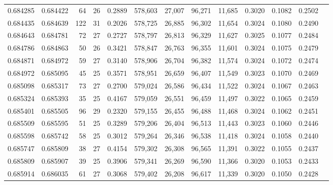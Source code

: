\begin{tabular}{rrrrrrrrrrrrr}
0.684285 & 0.684422 &  64 &  26 &                                     0.2889 & 578,603 &  27,007 &  96,271 &  11,685 & 0.3020 & 0.1082 & 0.2502 \\
0.684435 & 0.684639 & 122 &  31 &                                     0.2026 & 578,725 &  26,885 &  96,302 &  11,654 & 0.3024 & 0.1080 & 0.2490 \\
0.684643 & 0.684781 &  72 &  27 &                                     0.2727 & 578,797 &  26,813 &  96,329 &  11,627 & 0.3025 & 0.1077 & 0.2484 \\
0.684786 & 0.684863 &  50 &  26 &                                     0.3421 & 578,847 &  26,763 &  96,355 &  11,601 & 0.3024 & 0.1075 & 0.2479 \\
0.684871 & 0.684972 &  59 &  27 &                                     0.3140 & 578,906 &  26,704 &  96,382 &  11,574 & 0.3024 & 0.1072 & 0.2474 \\
0.684972 & 0.685095 &  45 &  25 &                                     0.3571 & 578,951 &  26,659 &  96,407 &  11,549 & 0.3023 & 0.1070 & 0.2469 \\
0.685098 & 0.685317 &  73 &  27 &                                     0.2700 & 579,024 &  26,586 &  96,434 &  11,522 & 0.3024 & 0.1067 & 0.2463 \\
0.685324 & 0.685393 &  35 &  25 &                                     0.4167 & 579,059 &  26,551 &  96,459 &  11,497 & 0.3022 & 0.1065 & 0.2459 \\
0.685401 & 0.685505 &  96 &  29 &                                     0.2320 & 579,155 &  26,455 &  96,488 &  11,468 & 0.3024 & 0.1062 & 0.2451 \\
0.685509 & 0.685595 &  51 &  25 &                                     0.3289 & 579,206 &  26,404 &  96,513 &  11,443 & 0.3023 & 0.1060 & 0.2446 \\
0.685598 & 0.685742 &  58 &  25 &                                     0.3012 & 579,264 &  26,346 &  96,538 &  11,418 & 0.3024 & 0.1058 & 0.2440 \\
0.685747 & 0.685809 &  38 &  27 &                                     0.4154 & 579,302 &  26,308 &  96,565 &  11,391 & 0.3022 & 0.1055 & 0.2437 \\
0.685809 & 0.685907 &  39 &  25 &                                     0.3906 & 579,341 &  26,269 &  96,590 &  11,366 & 0.3020 & 0.1053 & 0.2433 \\
0.685914 & 0.686035 &  61 &  27 &                                     0.3068 & 579,402 &  26,208 &  96,617 &  11,339 & 0.3020 & 0.1050 & 0.2428 \\

\end{tabular}
